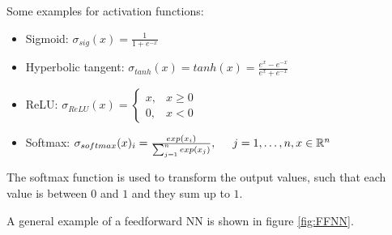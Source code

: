\documentclass[a4paper, 12pt]{scrreprt} %
\begin{document}
Some examples for activation functions:
\begin{itemize}
	\item Sigmoid: $\sigma_{sig}(x) = \frac{1}{1+e^{-x}}$
	\item Hyperbolic tangent: $\sigma_{tanh}(x) = tanh(x) = \frac{e^x-e^{-x}}{e^x+e^{-x}}$
	\item ReLU: $\sigma_{ReLU}(x) = \begin{cases} x, & x \geq 0 \\ 0, & x < 0\end{cases}$
	\item Softmax: $\sigma_{softmax}(x)_{i} = \frac{exp(x_i)}{\sum_{j=1}^{n}{exp(x_j)}}, \hspace{0.5cm} j=1, \dots, n, x\in \mathbb{R}^n$
\end{itemize}

The softmax function is used to transform the output values, such that each value is between $0$ and $1$ and they sum up to $1$.

A general example of a feedforward \ac{NN} is shown in figure \ref{fig:FFNN}.
\end{document}
